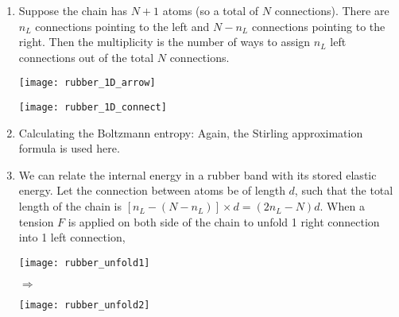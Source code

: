 \documentclass[class=article, crop=false, 12pt]{standalone}
\begin{document}
\begin{enumerate}
    \item Suppose the chain has $N+1$ atoms (so a total of $N$ connections).
    There are $n_L$ connections pointing to the left and 
    $N-n_L$ connections pointing to the right.
    Then the multiplicity is the number of ways to assign $n_L$ left connections out of the total $N$ connections.

    \begin{center}
        \begin{minipage}{0.6\linewidth}
            \centering
            \texttt{[image: rubber\_1D\_arrow]}
        \end{minipage}
        \hspace{0.05\textwidth}
        \begin{minipage}{0.2\linewidth}
            \centering
            \texttt{[image: rubber\_1D\_connect]}
        \end{minipage}
    \end{center}

    \item Calculating the Boltzmann entropy:
    Again, the Stirling approximation formula is used here.

    \item We can relate the internal energy in a rubber band with its stored elastic energy.
    Let the connection between atoms be of length $d$, 
    such that the total length of the chain is $[n_L - (N-n_L)]\times d = (2n_L-N)d$.
    When a tension $F$ is applied on both side of the chain
    to unfold 1 right connection into 1 left connection,

    \begin{center}
        \begin{minipage}{0.3\linewidth}
            \centering
            \texttt{[image: rubber\_unfold1]}
        \end{minipage}
        \qquad$\Rightarrow$\qquad
        \begin{minipage}{0.4\linewidth}
            \centering
            \texttt{[image: rubber\_unfold2]}
        \end{minipage}
    \end{center}


\end{enumerate}
\end{document}

